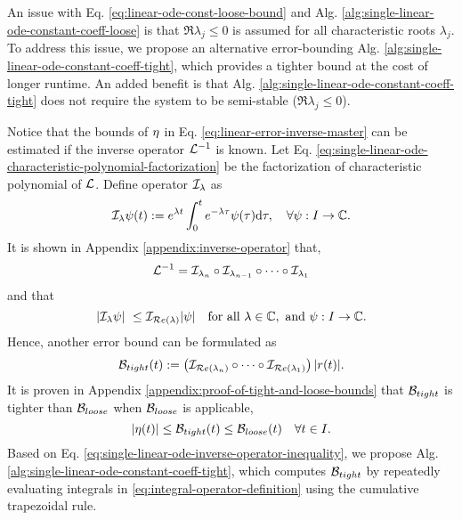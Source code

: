     An issue with Eq. \eqref{eq:linear-ode-const-loose-bound} and Alg. \ref{alg:single-linear-ode-constant-coeff-loose} is that $\Re{\lambda_j} \leq 0$ is assumed for all characteristic roots $\lambda_j$. 
    To address this issue, we propose an alternative error-bounding Alg. \ref{alg:single-linear-ode-constant-coeff-tight}, which provides a tighter bound at the cost of longer runtime. 
    An added benefit is that Alg. \ref{alg:single-linear-ode-constant-coeff-tight} does not require the system to be semi-stable ($\Re{\lambda_j} \leq 0$).

    Notice that the bounds of $\eta$ in Eq. \eqref{eq:linear-error-inverse-master} can be estimated if the inverse operator $\mathcal{L}^{-1}$ is known. 
    Let Eq. \eqref{eq:single-linear-ode-characteristic-polynomial-factorization} be the factorization of characteristic polynomial of $\mathcal{L}$.
    Define operator $\mathcal{I}_{\lambda}$ as
    \begin{equation} \label{eq:integral-operator-definition}
        \mathcal{I}_\lambda \psi(t) := e^{{\lambda} t} \int_{0}^{t} e^{-{\lambda} \tau} \psi(\tau) \mathrm{d}\tau, \quad \forall \psi : I \to \mathbb{C}.
    \end{equation}
    It is shown in Appendix \ref{appendix:inverse-operator} that,
    \begin{equation} \label{eq:single-linear-ode-inverse-operator-factorization}
        \mathcal{L}^{-1} = \mathcal{I}_{\lambda_{n}} \circ \mathcal{I}_{\lambda_{n-1}} \circ \dots \circ \mathcal{I}_{\lambda_1}
    \end{equation} 
    and that 
    \begin{equation} \label{eq:inverse-operator-inequality}
        \left|\mathcal{I}_{\lambda} \psi\right| \ \leq \mathcal{I}_{\mathcal{R}e\left(\lambda\right)} |\psi| \quad \text{for all }\lambda \in \mathbb{C}, \text{ and } \psi : I \to \mathbb{C}.
    \end{equation} 
    Hence, another error bound can be formulated as
    \begin{equation} \label{eq:single-linear-ode-inverse-operator-inequality}
        \mathcal{B}_{tight}(t) := \left(\mathcal{I}_{\mathcal{R}e\left(\lambda_{n}\right)} \circ \dots \circ \mathcal{I}_{\mathcal{R}e\left(\lambda_1\right)}\right) |r(t)|.
    \end{equation}
    It is proven in Appendix \ref{appendix:proof-of-tight-and-loose-bounds} that $\mathcal{B}_{tight}$ is tighter than $\mathcal{B}_{loose}$ when $\mathcal{B}_{loose}$ is applicable,
    \begin{equation} \label{eq:single-linear-ode-tight-and-loose}
        \left|\eta(t)\right| \leq \mathcal{B}_{tight}(t) \leq \mathcal{B}_{loose}(t) \quad \forall t \in I.
    \end{equation}
    Based on Eq. \eqref{eq:single-linear-ode-inverse-operator-inequality}, we propose Alg. \ref{alg:single-linear-ode-constant-coeff-tight}, which computes $\mathcal{B}_{tight}$ by repeatedly evaluating integrals in \eqref{eq:integral-operator-definition} using the cumulative trapezoidal rule.

